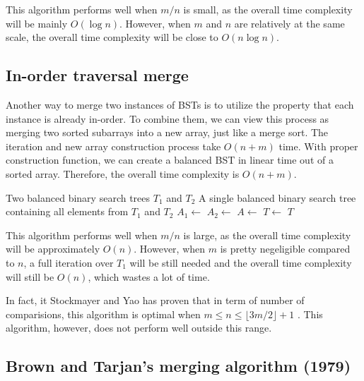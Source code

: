 \documentclass[12pt]{article}
\begin{document}
This algorithm performs well when $m/n$ is small, as the overall time complexity will be mainly $O(\log n)$. However, when $m$ and $n$ are relatively at the same scale, the overall time complexity will be close to $O(n\log n)$.

\subsection{In-order traversal merge}

Another way to merge two instances of BSTs is to utilize the property that each instance is already in-order. To combine them, we can view this process as merging two sorted subarrays into a new array, just like a merge sort. The iteration and new array construction process take $O(n+m)$ time. With proper construction function, we can create a balanced BST in linear time out of a sorted array. Therefore, the overall time complexity is $O(n+m)$.

\begin{tcolorbox}[colback=orange!5!white, colframe=orange!75!black, title=Algorithm: In-order traversal merge]
\begin{algorithmic}[1]
\Require Two balanced binary search trees $T_1$ and $T_2$
\Ensure A single balanced binary search tree containing all elements from $T_1$ and $T_2$
    \State $A_1 \gets$ 
    \State $A_2 \gets$ 
    \State $A \gets$ 
    \State $T \gets$ 
    \State \Return $T$
\EndProcedure
\end{algorithmic}
\end{tcolorbox}

This algorithm performs well when $m/n$ is large, as the overall time complexity will be approximately $O(n)$. However, when $m$ is pretty negeligible compared to $n$, a full iteration over $T_1$ will be still needed and the overall time complexity will still be $O(n)$, which wastes a lot of time.

In fact, it Stockmayer and Yao has proven that in term of number of comparisions, this algorithm is optimal when $m\le n\le \lfloor 3m/2 \rfloor +1$ \cite{stockmeyer1980optimality}. This algorithm, however, does not perform well outside this range. 

\subsection{Brown and Tarjan's merging algorithm (1979)}
\end{document}
